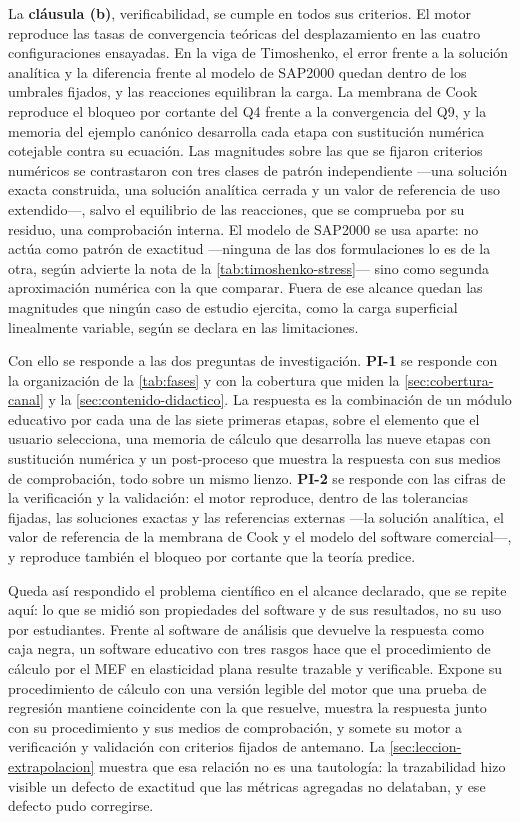 La \textbf{cláusula (b)}, verificabilidad, se cumple en todos sus criterios. El motor reproduce las tasas de convergencia teóricas del desplazamiento en las cuatro configuraciones ensayadas. En la viga de Timoshenko, el error frente a la solución analítica y la diferencia frente al modelo de SAP2000 quedan dentro de los umbrales fijados, y las reacciones equilibran la carga. La membrana de Cook reproduce el bloqueo por cortante del Q4 frente a la convergencia del Q9, y la memoria del ejemplo canónico desarrolla cada etapa con sustitución numérica cotejable contra su ecuación. Las magnitudes sobre las que se fijaron criterios numéricos se contrastaron con tres clases de patrón independiente ---una solución exacta construida, una solución analítica cerrada y un valor de referencia de uso extendido---, salvo el equilibrio de las reacciones, que se comprueba por su residuo, una comprobación interna. El modelo de SAP2000 se usa aparte: no actúa como patrón de exactitud ---ninguna de las dos formulaciones lo es de la otra, según advierte la nota de la \autoref{tab:timoshenko-stress}--- sino como segunda aproximación numérica con la que comparar. Fuera de ese alcance quedan las magnitudes que ningún caso de estudio ejercita, como la carga superficial linealmente variable, según se declara en las limitaciones.

Con ello se responde a las dos preguntas de investigación. \textbf{PI-1} se responde con la organización de la \autoref{tab:fases} y con la cobertura que miden la \autoref{sec:cobertura-canal} y la \autoref{sec:contenido-didactico}. La respuesta es la combinación de un módulo educativo por cada una de las siete primeras etapas, sobre el elemento que el usuario selecciona, una memoria de cálculo que desarrolla las nueve etapas con sustitución numérica y un post-proceso que muestra la respuesta con sus medios de comprobación, todo sobre un mismo lienzo. \textbf{PI-2} se responde con las cifras de la verificación y la validación: el motor reproduce, dentro de las tolerancias fijadas, las soluciones exactas y las referencias externas ---la solución analítica, el valor de referencia de la membrana de Cook y el modelo del software comercial---, y reproduce también el bloqueo por cortante que la teoría predice.

Queda así respondido el problema científico en el alcance declarado, que se repite aquí: lo que se midió son propiedades del software y de sus resultados, no su uso por estudiantes. Frente al software de análisis que devuelve la respuesta como caja negra, un software educativo con tres rasgos hace que el procedimiento de cálculo por el MEF en elasticidad plana resulte trazable y verificable. Expone su procedimiento de cálculo con una versión legible del motor que una prueba de regresión mantiene coincidente con la que resuelve, muestra la respuesta junto con su procedimiento y sus medios de comprobación, y somete su motor a verificación y validación con criterios fijados de antemano. La \autoref{sec:leccion-extrapolacion} muestra que esa relación no es una tautología: la trazabilidad hizo visible un defecto de exactitud que las métricas agregadas no delataban, y ese defecto pudo corregirse.
